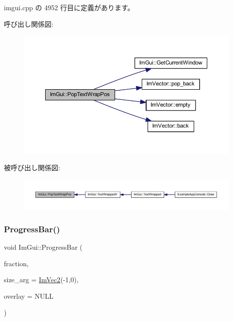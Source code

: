  imgui.\+cpp の 4952 行目に定義があります。

呼び出し関係図\+:\nopagebreak
\begin{figure}[H]
\begin{center}
\leavevmode
\includegraphics[width=350pt]{namespace_im_gui_a08000421b9cc13757430efe54178ae0f_cgraph}
\end{center}
\end{figure}
被呼び出し関係図\+:\nopagebreak
\begin{figure}[H]
\begin{center}
\leavevmode
\includegraphics[width=350pt]{namespace_im_gui_a08000421b9cc13757430efe54178ae0f_icgraph}
\end{center}
\end{figure}
\mbox{\label{namespace_im_gui_a83349d38c7c73f92ae977bc5b530a9e9}} 
\subsubsection{\texorpdfstring{Progress\+Bar()}{ProgressBar()}}
{\footnotesize\ttfamily void Im\+Gui\+::\+Progress\+Bar (\begin{DoxyParamCaption}\item[{float}]{fraction,  }\item[{const \mbox{\hyperlink{struct_im_vec2}{Im\+Vec2}} \&}]{size\+\_\+arg = {\ttfamily \mbox{\hyperlink{struct_im_vec2}{Im\+Vec2}}(-\/1,0)},  }\item[{const char $\ast$}]{overlay = {\ttfamily NULL} }\end{DoxyParamCaption})}



